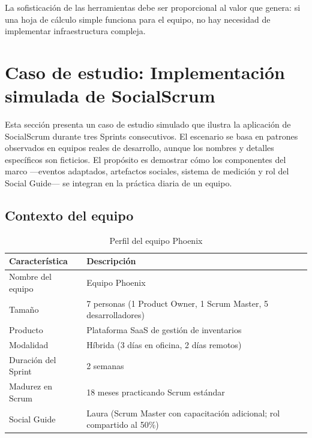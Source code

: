 La sofisticación de las herramientas debe ser proporcional al valor que genera: si una hoja de cálculo simple funciona para el equipo, no hay necesidad de implementar infraestructura compleja.

\section{Caso de estudio: Implementación simulada de SocialScrum}

Esta sección presenta un caso de estudio simulado que ilustra la aplicación de SocialScrum durante tres Sprints consecutivos. El escenario se basa en patrones observados en equipos reales de desarrollo, aunque los nombres y detalles específicos son ficticios. El propósito es demostrar cómo los componentes del marco ---eventos adaptados, artefactos sociales, sistema de medición y rol del Social Guide--- se integran en la práctica diaria de un equipo.

\subsection{Contexto del equipo}

\begin{table}[h]
    \centering
    \small
    \begin{tabularx}{\textwidth}{|l|X|}
        \hline
        \textbf{Característica} & \textbf{Descripción}                                                    \\
        \hline
        Nombre del equipo
                                & Equipo Phoenix                                                          \\
        \hline
        Tamaño
                                & 7 personas (1 Product Owner, 1 Scrum Master, 5 desarrolladores)         \\
        \hline
        Producto
                                & Plataforma SaaS de gestión de inventarios                               \\
        \hline
        Modalidad
                                & Híbrida (3 días en oficina, 2 días remotos)                             \\
        \hline
        Duración del Sprint
                                & 2 semanas                                                               \\
        \hline
        Madurez en Scrum
                                & 18 meses practicando Scrum estándar                                     \\
        \hline
        Social Guide
                                & Laura (Scrum Master con capacitación adicional; rol compartido al 50\%) \\
        \hline
    \end{tabularx}
    \caption{Perfil del equipo Phoenix}
    \label{tab:perfil-phoenix}
\end{table}
\FloatBarrier


